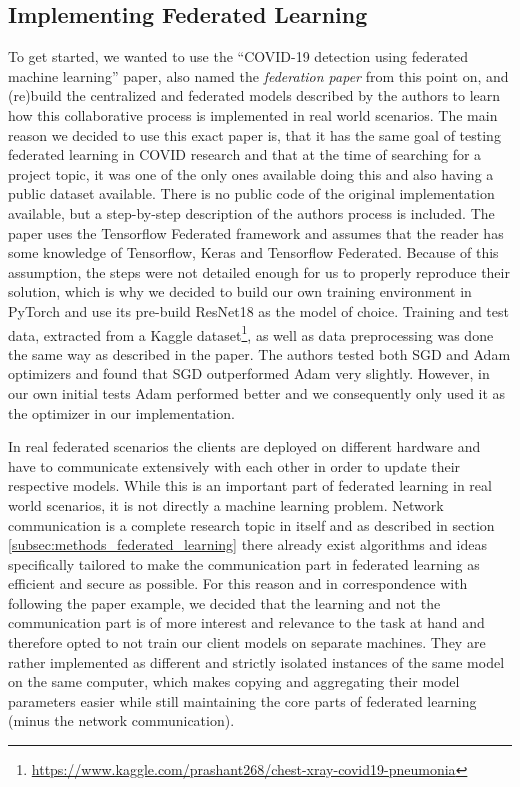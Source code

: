 \subsection{Implementing Federated Learning}\label{subsec:methods_original_paper}
To get started, we wanted to use the \enquote{COVID-19 detection using federated machine learning} paper\cite{federated_machine_learning}, also named the \textit{federation paper} from this point on, and (re)build the centralized and federated models described by the authors to learn how this collaborative process is implemented in real world scenarios. The main reason we decided to use this exact paper is, that it has the same goal of testing federated learning in COVID research and that at the time of searching for a project topic, it was one of the only ones available doing this and also having a public dataset available.
There is no public code of the original implementation available, but a step-by-step description of the authors process is included. The paper uses the Tensorflow Federated framework\cite{tensorflow_federated} and assumes that the reader has some knowledge of Tensorflow, Keras and Tensorflow Federated. Because of this assumption, the steps were not detailed enough for us to properly reproduce their solution, which is why we decided to build our own training environment in PyTorch and use its pre-build ResNet18 as the model of choice. Training and test data, extracted from a Kaggle dataset\footnote{\url{https://www.kaggle.com/prashant268/chest-xray-covid19-pneumonia}}, as well as data preprocessing was done the same way as described in the paper. The authors tested both SGD and Adam optimizers and found that SGD outperformed Adam very slightly. However, in our own initial tests Adam performed better and we consequently only used it as the optimizer in our implementation.

In real federated scenarios the clients are deployed on different hardware and have to communicate extensively with each other in order to update their respective models. While this is an important part of federated learning in real world scenarios, it is not directly a machine learning problem. Network communication is a complete research topic in itself and as described in section \ref{subsec:methods_federated_learning} there already exist algorithms and ideas specifically tailored to make the communication part in federated learning as efficient and secure as possible. For this reason and in correspondence with following the paper example, we decided that the learning and not the communication part is of more interest and relevance to the task at hand and therefore opted to not train our client models on separate machines. They are rather implemented as different and strictly isolated instances of the same model on the same computer, which makes copying and aggregating their model parameters easier while still maintaining the core parts of federated learning (minus the network communication).

